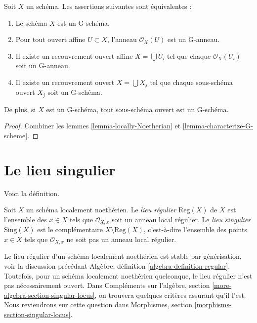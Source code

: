 \begin{lemma}
\label{lemma-locally-G-scheme}
Soit $X$ un schéma. Les assertions suivantes sont équivalentes :
\begin{enumerate}
\item Le schéma $X$ est un G-schéma.
\item Pour tout ouvert affine $U \subset X$, l'anneau $\mathcal{O}_X(U)$
est un G-anneau.
\item Il existe un recouvrement ouvert affine $X = \bigcup U_i$ tel que
chaque $\mathcal{O}_X(U_i)$ soit un G-anneau.
\item Il existe un recouvrement ouvert $X = \bigcup X_j$
tel que chaque sous-schéma ouvert $X_j$ soit un G-schéma.
\end{enumerate}
De plus, si $X$ est un G-schéma, tout sous-schéma ouvert est un
G-schéma.
\end{lemma}

\begin{proof}
Combiner les lemmes \ref{lemma-locally-Noetherian}
et \ref{lemma-characterize-G-scheme}.
\end{proof}




\section{Le lieu singulier}
\label{section-singular-locus}

\noindent
Voici la définition.

\begin{definition}
\label{definition-singular-locus}
Soit $X$ un schéma localement noethérien. Le {\it lieu régulier}
$\text{Reg}(X)$ de $X$ est l'ensemble des $x \in X$ tels que $\mathcal{O}_{X, x}$
soit un anneau local régulier. Le {\it lieu singulier} $\text{Sing}(X)$ est le
complémentaire $X \setminus \text{Reg}(X)$, c'est-à-dire l'ensemble des points $x \in X$
tels que $\mathcal{O}_{X, x}$ ne soit pas un anneau local régulier.
\end{definition}

\noindent
Le lieu régulier d'un schéma localement noethérien est stable
par générisation, voir la discussion précédant
Algèbre, définition \ref{algebra-definition-regular}.
Toutefois, pour un schéma localement noethérien quelconque, le lieu régulier n'est pas
nécessairement ouvert. Dans
Compléments sur l'algèbre, section \ref{more-algebra-section-singular-locus},
on trouvera quelques critères assurant qu'il l'est. Nous
reviendrons sur cette question dans
Morphismes, section \ref{morphisms-section-singular-locus}.







